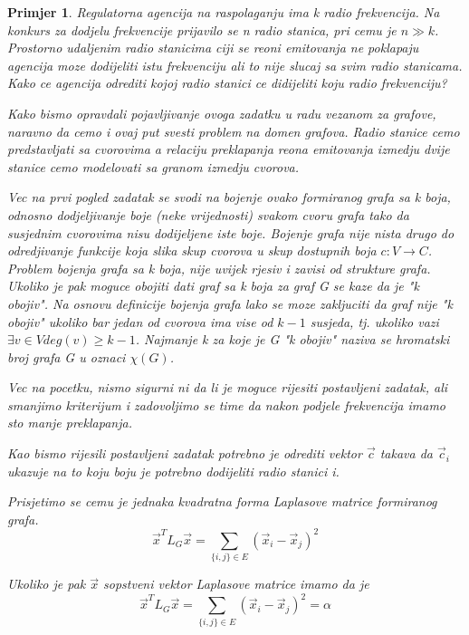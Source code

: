 \documentclass[11pt]{article}
\newtheorem{example}{Primjer}
\begin{document}
    \begin{example}
        Regulatorna agencija na raspolaganju ima k radio frekvencija. Na konkurs za dodjelu frekvencije prijavilo se n radio stanica, pri cemu je $n \gg k$.
        Prostorno udaljenim radio stanicima ciji se reoni emitovanja ne poklapaju agencija moze dodijeliti istu frekvenciju ali to nije slucaj sa svim radio stanicama.
        Kako ce agencija odrediti kojoj radio stanici ce didijeliti koju radio frekvenciju?

        Kako bismo opravdali pojavljivanje ovoga zadatku u radu vezanom za grafove, naravno da cemo i ovaj put svesti problem na domen grafova.
        Radio stanice cemo predstavljati sa cvorovima a relaciju preklapanja reona emitovanja izmedju dvije stanice cemo modelovati sa granom izmedju cvorova.

        Vec na prvi pogled zadatak se svodi na bojenje ovako formiranog grafa sa k boja, odnosno dodjeljivanje boje (neke vrijednosti) svakom cvoru grafa tako da
        susjednim cvorovima nisu dodijeljene iste boje. Bojenje grafa nije nista drugo do odredjivanje funkcije koja slika skup cvorova u skup dostupnih boja $ c : V \to C$.
        Problem bojenja grafa sa k boja, nije uvijek rjesiv i zavisi od strukture grafa. Ukoliko je pak moguce obojiti dati graf sa k boja za graf G se
        kaze da je "k obojiv". Na osnovu definicije bojenja grafa lako se moze zakljuciti da graf nije "k obojiv" ukoliko bar jedan od cvorova ima vise od $k-1$ susjeda, tj.
        ukoliko vazi $\exists v \in V deg(v) \geq k-1$. Najmanje k za koje je G "k obojiv" naziva se hromatski broj grafa G u oznaci $\chi(G)$.

        Vec na pocetku, nismo sigurni ni da li je moguce rijesiti postavljeni zadatak, ali smanjimo kriterijum i zadovoljimo se time da nakon podjele frekvencija imamo sto manje preklapanja.
        
        Kao bismo rijesili postavljeni zadatak potrebno je odrediti vektor $\vec{c}$ takava da $\vec{c}_i$ ukazuje na to koju boju je potrebno dodijeliti radio stanici i.

        Prisjetimo se cemu je jednaka kvadratna forma Laplasove matrice formiranog grafa.
        \[
            \vec{x}^T L_G \vec{x} = \sum_{\{i,j\} \in E} (\vec{x}_i - \vec{x}_j)^2
        \]
        
        Ukoliko je pak $\vec{x}$ sopstveni vektor Laplasove matrice imamo da je 
        \[
            \vec{x}^T L_G \vec{x} = \sum_{\{i,j\} \in E} (\vec{x}_i - \vec{x}_j)^2 = \alpha
        \]
        

\end{example}
\end{document}
